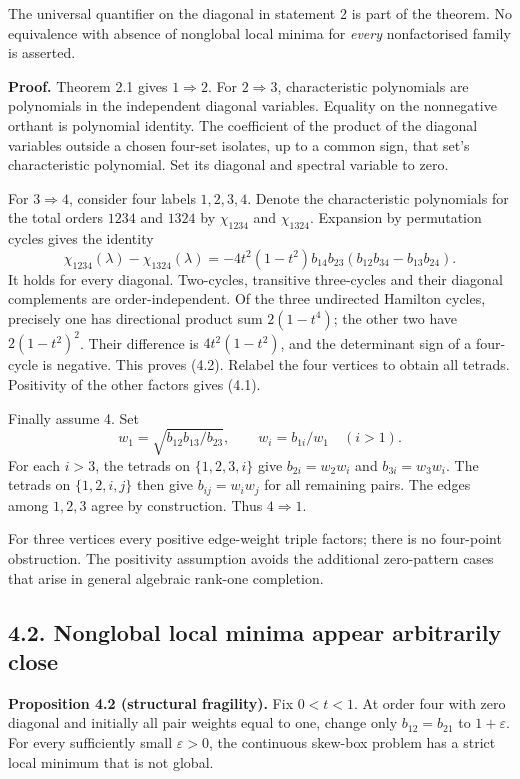\documentclass[
  11pt,
  a4paper,
]{article}
\begin{document}
The universal quantifier on the diagonal in statement 2 is part of the
theorem. No equivalence with absence of nonglobal local minima for
\emph{every} nonfactorised family is asserted.

\textbf{Proof.} Theorem 2.1 gives \(1\Rightarrow2\). For
\(2\Rightarrow3\), characteristic polynomials are polynomials in the
independent diagonal variables. Equality on the nonnegative orthant is
polynomial identity. The coefficient of the product of the diagonal
variables outside a chosen four-set isolates, up to a common sign, that
set's characteristic polynomial. Set its diagonal and spectral variable
to zero.

For \(3\Rightarrow4\), consider four labels \(1,2,3,4\). Denote the
characteristic polynomials for the total orders \(1234\) and \(1324\) by
\(\chi_{1234}\) and \(\chi_{1324}\). Expansion by permutation cycles
gives the identity \[
 \chi_{1234}(\lambda)-\chi_{1324}(\lambda)
 =-4t^2(1-t^2)b_{14}b_{23}
          (b_{12}b_{34}-b_{13}b_{24}).                       \tag{4.2}
\] It holds for every diagonal. Two-cycles, transitive three-cycles and
their diagonal complements are order-independent. Of the three
undirected Hamilton cycles, precisely one has directional product sum
\(2(1-t^4)\); the other two have \(2(1-t^2)^2\). Their difference is
\(4t^2(1-t^2)\), and the determinant sign of a four-cycle is negative.
This proves (4.2). Relabel the four vertices to obtain all tetrads.
Positivity of the other factors gives (4.1).

Finally assume 4. Set
\[w_1=\sqrt{b_{12}b_{13}/b_{23}},\qquad w_i=b_{1i}/w_1\quad(i>1).\] For
each \(i>3\), the tetrads on \(\{1,2,3,i\}\) give \(b_{2i}=w_2w_i\) and
\(b_{3i}=w_3w_i\). The tetrads on \(\{1,2,i,j\}\) then give
\(b_{ij}=w_iw_j\) for all remaining pairs. The edges among \(1,2,3\)
agree by construction. Thus \(4\Rightarrow1\).

For three vertices every positive edge-weight triple factors; there is
no four-point obstruction. The positivity assumption avoids the
additional zero-pattern cases that arise in general algebraic rank-one
completion.

\subsection{4.2. Nonglobal local minima appear arbitrarily
close}\label{nonglobal-local-minima-appear-arbitrarily-close}

\textbf{Proposition 4.2 (structural fragility).} Fix \(0<t<1\). At order
four with zero diagonal and initially all pair weights equal to one,
change only \(b_{12}=b_{21}\) to \(1+\varepsilon\). For every
sufficiently small \(\varepsilon>0\), the continuous skew-box problem
has a strict local minimum that is not global.
\end{document}
